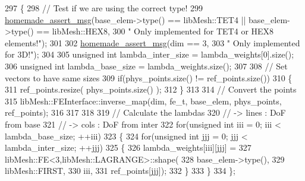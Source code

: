 \begin{DoxyCode}
297     \{
298         \textcolor{comment}{// Test if we are using the correct type!}
299         \hyperlink{common__header_8h_a593ccc80b790b2268653fcf6597bf451}{homemade\_assert\_msg}(base\_elem->type() == libMesh::TET4 || base\_elem->type() == 
      libMesh::HEX8,
300                 \textcolor{stringliteral}{" Only implemented for TET4 or HEX8 elements!"});
301 
302         \hyperlink{common__header_8h_a593ccc80b790b2268653fcf6597bf451}{homemade\_assert\_msg}(dim == 3,
303                 \textcolor{stringliteral}{" Only implemented for 3D!"});
304 
305         \textcolor{keywordtype}{unsigned} \textcolor{keywordtype}{int} lambda\_inter\_size = lambda\_weights[0].size();
306         \textcolor{keywordtype}{unsigned} \textcolor{keywordtype}{int} lambda\_base\_size  = lambda\_weights.size();
307 
308         \textcolor{comment}{// Set vectors to have same sizes}
309         \textcolor{keywordflow}{if}(phys\_points.size() != ref\_points.size())
310         \{
311             ref\_points.resize( phys\_points.size() );
312         \}
313 
314         \textcolor{comment}{// Convert the points}
315         libMesh::FEInterface::inverse\_map(dim, fe\_t, base\_elem, phys\_points, ref\_points);
316 
317 
318 
319         \textcolor{comment}{// Calculate the lambdas}
320         \textcolor{comment}{// -> lines : DoF from base}
321         \textcolor{comment}{// -> cols  : DoF from inter}
322         \textcolor{keywordflow}{for}(\textcolor{keywordtype}{unsigned} \textcolor{keywordtype}{int} iii = 0; iii < lambda\_base\_size; ++iii)
323         \{
324             \textcolor{keywordflow}{for}(\textcolor{keywordtype}{unsigned} \textcolor{keywordtype}{int} jjj = 0; jjj < lambda\_inter\_size; ++jjj)
325             \{
326                 lambda\_weights[iii][jjj] =
327                         libMesh::FE<3,libMesh::LAGRANGE>::shape(
328                                 base\_elem->type(),
329                                 libMesh::FIRST,
330                                 iii,
331                                 ref\_points[jjj]);
332             \}
333         \}
334     \};
\end{DoxyCode}
\hypertarget{classcarl_1_1assemble__coupling__matrices_af8853c49243dcd7abb0778d260cfbd6e}{}
